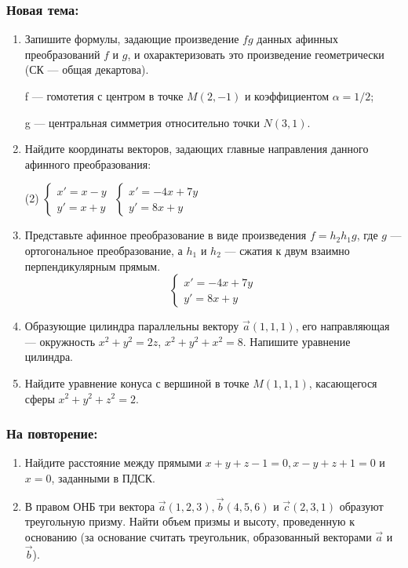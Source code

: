 
\subsubsection*{Новая тема:}

\begin{enumerate}
    \item Запишите формулы, задающие произведение $fg$ данных афинных преобразований $f$ и $g$, и охарактеризовать это произведение геометрически (СК --- общая декартова).
    
    f --- гомотетия с центром в точке $M(2, -1)$ и коэффициентом $\alpha=1/2$;
    
    g --- центральная симметрия относительно точки $N(3, 1)$.
    \item Найдите координаты векторов, задающих главные направления данного афинного преобразования:
    \begin{tasks}(2)
    	\task $\begin{cases}x' = x-y\\y'=x+y\end{cases}$
    	\task $\begin{cases}x' = -4x+7y\\y'=8x+y\end{cases}$
    \end{tasks}
    
    \item Представьте афинное преобразование в виде произведения $f=h_2h_1g$, где $g$ --- ортогональное преобразование, а $h_1$ и $h_2$ --- сжатия к двум взаимно перпендикулярным прямым. 
    $$\begin{cases}x' = -4x+7y\\y'=8x+y\end{cases}$$
    
    \item Образующие цилиндра параллельны вектору $\vec a(1, 1, 1)$, его направляющая --- окружность $x^2 + y^2 = 2z$, $x^2+y^2+x^2=8$. Напишите уравнение цилиндра.
    \item Найдите уравнение конуса с вершиной в точке $M(1, 1, 1)$, касающегося сферы $x^2 + y^2 + z^2 = 2$.
\end{enumerate}

\subsubsection*{На повторение:}
\begin{enumerate}
    \item Найдите расстояние между прямыми $x+y+z-1=0, x-y+z+1=0$ и $x=0$, заданными в ПДСК.
    \item В правом ОНБ три вектора $\vec a(1, 2, 3), \vec b(4, 5, 6)$  и $\vec c(2, 3, 1)$ образуют треугольную призму. Найти объем призмы и высоту, проведенную к основанию (за основание считать треугольник, образованный векторами $\vec a$ и $\vec b$). 
 \end{enumerate}